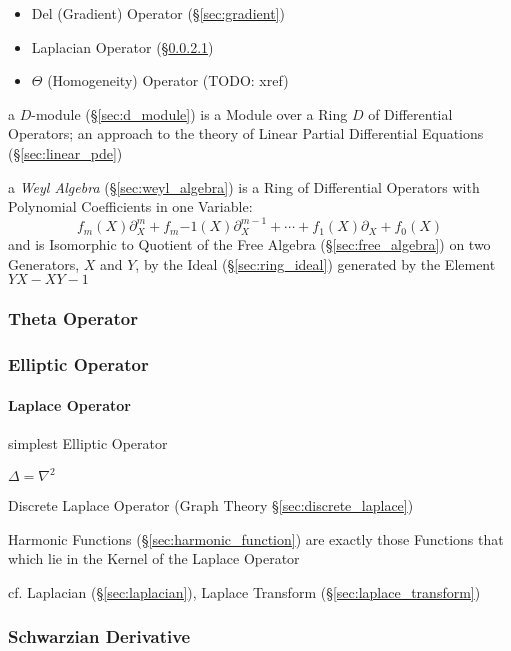 \begin{itemize}
  \item Del (Gradient) Operator (\S\ref{sec:gradient})
  \item Laplacian Operator (\S\ref{sec:laplace_operator})
  \item $\Theta$ (Homogeneity) Operator (TODO: xref)
\end{itemize}

\fist a $D$-module (\S\ref{sec:d_module}) is a Module over a Ring $D$ of
Differential Operators; an approach to the theory of Linear Partial Differential
Equations (\S\ref{sec:linear_pde})

\fist a \emph{Weyl Algebra} (\S\ref{sec:weyl_algebra}) is a Ring of
Differential Operators with Polynomial Coefficients in one Variable:
\[
  f_m(X)\partial^m_X + f_m{-1}(X)\partial^{m-1}_X + \cdots +
    f_1(X)\partial_X + f_0(X)
\]
and is Isomorphic to Quotient of the Free Algebra (\S\ref{sec:free_algebra}) on
two Generators, $X$ and $Y$, by the Ideal (\S\ref{sec:ring_ideal}) generated by
the Element $YX - XY - 1$



\subsubsection{Theta Operator}\label{sec:theta_operator}

\subsubsection{Elliptic Operator}\label{sec:elliptic_operator}

\paragraph{Laplace Operator}\label{sec:laplace_operator}\hfill

simplest Elliptic Operator

$\Delta = \nabla^2$

Discrete Laplace Operator (Graph Theory \S\ref{sec:discrete_laplace})

Harmonic Functions (\S\ref{sec:harmonic_function}) are exactly those Functions
that which lie in the Kernel of the Laplace Operator

\fist cf. Laplacian (\S\ref{sec:laplacian}), Laplace Transform
(\S\ref{sec:laplace_transform})



\subsubsection{Schwarzian Derivative}\label{sec:schwarzian_derivative}

